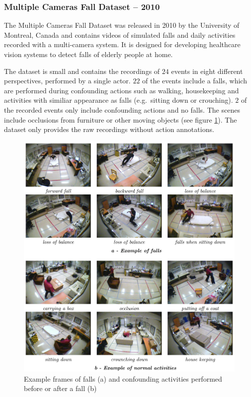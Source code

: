 

\subsubsection{Multiple Cameras Fall Dataset -- 2010}
\cite{auvinet_multiple_2010}
The Multiple Cameras Fall Dataset was released in 2010 by the University of Montreal, Canada \cite{auvinet_multiple_2010} and contains videos of simulated falls and daily activities recorded with a multi-camera system.
It is designed for developing healthcare vision systems to detect falls of elderly people at home.

The dataset is small and contains the recordings of $24$ events in eight different perspectives, performed by a single actor.
$22$ of the events include a falls, which are performed during confounding actions such as walking, housekeeping and activities with similiar appearance as falls (e.g.\ sitting down or crouching).
$2$ of the recorded events only include confounding actions and no falls.
The scenes include occlusions from furniture or other moving objects (see figure \ref{fig:multiplecamerasfall_example}).
The dataset only provides the raw recordings without action annotations.

\begin{figure}[H]
    \centering
    \includegraphics[width=\textwidth]{img_datasets/multiplecamerasfall_example}
    \caption{Example frames of falls (a) and confounding activities performed before or after a fall (b) \cite{auvinet_multiple_2010}}
    \label{fig:multiplecamerasfall_example}
\end{figure}


